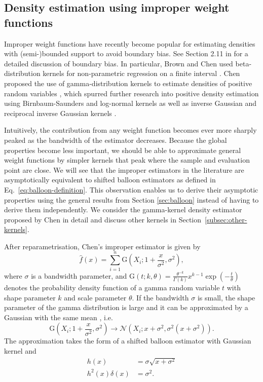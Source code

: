 \subsection{Density estimation using improper weight functions}

Improper weight functions have recently become popular for estimating densities with (semi-)bounded support to avoid boundary bias. See Section 2.11 in \cite{Wand1995} for a detailed discussion of boundary bias. In particular, Brown and Chen used beta-distribution kernels for non-parametric regression on a finite interval \cite{Brown1999}. Chen proposed the use of gamma-distribution kernels to estimate densities of positive random variables \cite{Chen2000}, which spurred further research into positive density estimation using Birnbaum-Saunders and log-normal kernels \cite{Jin2003} as well as inverse Gaussian and reciprocal inverse Gaussian kernels \cite{Scaillet2004}. 

Intuitively, the contribution from any weight function becomes ever more sharply peaked as the bandwidth of the estimator decreases. Because the global properties become less important, we should be able to approximate general weight functions by simpler kernels that peak where the sample and evaluation point are close. We will see that the improper estimators in the literature are asymptotically equivalent to shifted balloon estimators as defined in Eq.~\eqref{eq:balloon-definition}. This observation enables us to derive their asymptotic properties using the general results from Section \ref{sec:balloon} instead of having to derive them independently. We consider the gamma-kernel density estimator proposed by Chen \cite{Chen2000} in detail and discuss other kernels in Section~\ref{subsec:other-kernels}.

After reparametrisation, Chen's improper estimator is given by
\[
\hat{f}\left(x\right)=\sum_{i=1}^{n}\mathrm{G}\left(X_{i};1+\frac{x}{\sigma^{2}},\sigma^{2}\right),
\]
where $\sigma$ is a bandwidth parameter, and $\mathrm{G}\left(t;k,\theta\right)=\frac{\theta^{-k}}{\Gamma\left(k\right)}x^{k-1}\exp\left(-\frac{t}{\theta}\right)$ denotes the probability density function of a gamma random variable $t$ with shape parameter $k$ and scale parameter $\theta$. If the bandwidth $\sigma$ is small, the shape parameter of the gamma distribution is large and it can be approximated by a Gaussian with the same mean \cite{Johnson1994}, i.e.
\[
\mathrm{G}\left(X_{i};1+\frac{x}{\sigma^{2}},\sigma^{2}\right)\rightarrow\mathcal{N}\left(X_{i};x+\sigma^{2},\sigma^{2}\left(x+\sigma^{2}\right)\right).
\]
The approximation takes the form of a shifted balloon estimator with Gaussian kernel and 
\begin{align*}
h\left(x\right) & =\sigma\sqrt{x+\sigma^{2}}\\
h^{2}\left(x\right)\delta\left(x\right) & =\sigma^{2}.
\end{align*}


